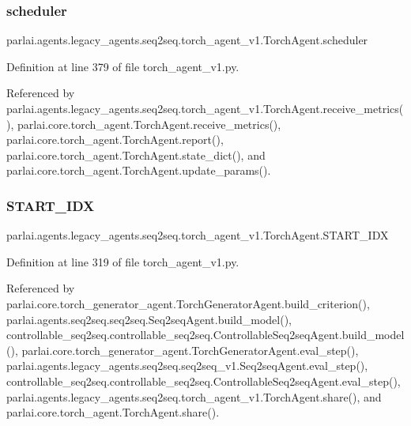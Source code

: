 \subsubsection{\texorpdfstring{scheduler}{scheduler}}
{\footnotesize\ttfamily parlai.\+agents.\+legacy\+\_\+agents.\+seq2seq.\+torch\+\_\+agent\+\_\+v1.\+Torch\+Agent.\+scheduler}



Definition at line 379 of file torch\+\_\+agent\+\_\+v1.\+py.



Referenced by parlai.\+agents.\+legacy\+\_\+agents.\+seq2seq.\+torch\+\_\+agent\+\_\+v1.\+Torch\+Agent.\+receive\+\_\+metrics(), parlai.\+core.\+torch\+\_\+agent.\+Torch\+Agent.\+receive\+\_\+metrics(), parlai.\+core.\+torch\+\_\+agent.\+Torch\+Agent.\+report(), parlai.\+core.\+torch\+\_\+agent.\+Torch\+Agent.\+state\+\_\+dict(), and parlai.\+core.\+torch\+\_\+agent.\+Torch\+Agent.\+update\+\_\+params().

\mbox{\label{classparlai_1_1agents_1_1legacy__agents_1_1seq2seq_1_1torch__agent__v1_1_1TorchAgent_a37d6429a766547a68f72ffb6c27783db}} 
\subsubsection{\texorpdfstring{S\+T\+A\+R\+T\+\_\+\+I\+DX}{START\_IDX}}
{\footnotesize\ttfamily parlai.\+agents.\+legacy\+\_\+agents.\+seq2seq.\+torch\+\_\+agent\+\_\+v1.\+Torch\+Agent.\+S\+T\+A\+R\+T\+\_\+\+I\+DX}



Definition at line 319 of file torch\+\_\+agent\+\_\+v1.\+py.



Referenced by parlai.\+core.\+torch\+\_\+generator\+\_\+agent.\+Torch\+Generator\+Agent.\+build\+\_\+criterion(), parlai.\+agents.\+seq2seq.\+seq2seq.\+Seq2seq\+Agent.\+build\+\_\+model(), controllable\+\_\+seq2seq.\+controllable\+\_\+seq2seq.\+Controllable\+Seq2seq\+Agent.\+build\+\_\+model(), parlai.\+core.\+torch\+\_\+generator\+\_\+agent.\+Torch\+Generator\+Agent.\+eval\+\_\+step(), parlai.\+agents.\+legacy\+\_\+agents.\+seq2seq.\+seq2seq\+\_\+v1.\+Seq2seq\+Agent.\+eval\+\_\+step(), controllable\+\_\+seq2seq.\+controllable\+\_\+seq2seq.\+Controllable\+Seq2seq\+Agent.\+eval\+\_\+step(), parlai.\+agents.\+legacy\+\_\+agents.\+seq2seq.\+torch\+\_\+agent\+\_\+v1.\+Torch\+Agent.\+share(), and parlai.\+core.\+torch\+\_\+agent.\+Torch\+Agent.\+share().


